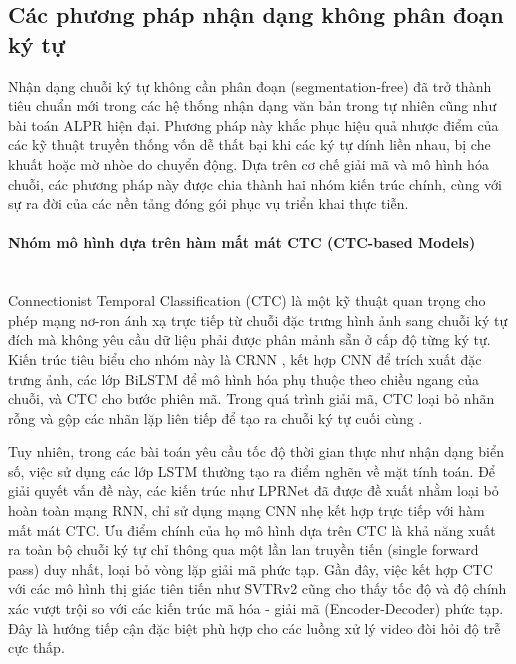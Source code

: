 \documentclass[../DoAn.tex]{subfiles}
\begin{document}
\subsection{Các phương pháp nhận dạng không phân đoạn ký tự}
\label{subsection:2.5.2}
Nhận dạng chuỗi ký tự không cần phân đoạn (segmentation-free) đã trở thành tiêu chuẩn mới trong các hệ thống nhận dạng văn bản trong tự nhiên cũng như bài toán ALPR hiện đại. Phương pháp này khắc phục hiệu quả nhược điểm của các kỹ thuật truyền thống vốn dễ thất bại khi các ký tự dính liền nhau, bị che khuất hoặc mờ nhòe do chuyển động. Dựa trên cơ chế giải mã và mô hình hóa chuỗi, các phương pháp này được chia thành hai nhóm kiến trúc chính, cùng với sự ra đời của các nền tảng đóng gói phục vụ triển khai thực tiễn.

\paragraph{Nhóm mô hình dựa trên hàm mất mát CTC (CTC-based Models)}
\mbox{}\\
Connectionist Temporal Classification (CTC) là một kỹ thuật quan trọng cho phép mạng nơ-ron ánh xạ trực tiếp từ chuỗi đặc trưng hình ảnh sang chuỗi ký tự đích mà không yêu cầu dữ liệu phải được phân mảnh sẵn ở cấp độ từng ký tự. Kiến trúc tiêu biểu cho nhóm này là CRNN \cite{shi2017crnn}, kết hợp CNN để trích xuất đặc trưng ảnh, các lớp BiLSTM để mô hình hóa phụ thuộc theo chiều ngang của chuỗi, và CTC cho bước phiên mã. Trong quá trình giải mã, CTC loại bỏ nhãn rỗng và gộp các nhãn lặp liên tiếp để tạo ra chuỗi ký tự cuối cùng \cite{shi2017crnn}.

Tuy nhiên, trong các bài toán yêu cầu tốc độ thời gian thực như nhận dạng biển số, việc sử dụng các lớp LSTM thường tạo ra điểm nghẽn về mặt tính toán. Để giải quyết vấn đề này, các kiến trúc như LPRNet \cite{zherzdev2018lprnet} đã được đề xuất nhằm loại bỏ hoàn toàn mạng RNN, chỉ sử dụng mạng CNN nhẹ kết hợp trực tiếp với hàm mất mát CTC. Ưu điểm chính của họ mô hình dựa trên CTC là khả năng xuất ra toàn bộ chuỗi ký tự chỉ thông qua một lần lan truyền tiến (single forward pass) duy nhất, loại bỏ vòng lặp giải mã phức tạp. Gần đây, việc kết hợp CTC với các mô hình thị giác tiên tiến như SVTRv2 \cite{gu2022svtr} cũng cho thấy tốc độ và độ chính xác vượt trội so với các kiến trúc mã hóa - giải mã (Encoder-Decoder) phức tạp. Đây là hướng tiếp cận đặc biệt phù hợp cho các luồng xử lý video đòi hỏi độ trễ cực thấp.
\end{document}
